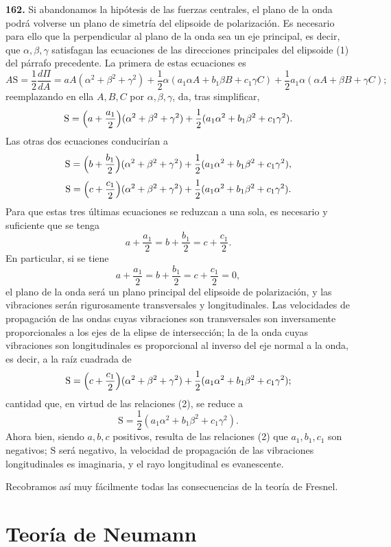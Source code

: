\noindent\textbf{162.} Si abandonamos la hipótesis de las fuerzas
centrales, el plano de la onda podrá volverse un plano de simetría del
elipsoide de polarización. Es necesario para ello que la perpendicular al
plano de la onda sea un eje principal, es decir, que
$\alpha,\beta,\gamma$ satisfagan las ecuaciones de las direcciones
principales del elipsoide (1) del párrafo precedente. La primera de estas
ecuaciones es
\[
A\mathrm S=\frac{1}{2}\frac{d\Pi}{dA}
=aA(\alpha^2+\beta^2+\gamma^2)+\frac{1}{2}\alpha(a_1\alpha A+b_1\beta B+c_1\gamma C)
+\frac{1}{2}a_1\alpha(\alpha A+\beta B+\gamma C);
\]
reemplazando en ella $A,B,C$ por $\alpha,\beta,\gamma$, da, tras
simplificar,
\[
\mathrm S=\Bigl(a+\frac{a_1}{2}\Bigr)(\alpha^2+\beta^2+\gamma^2)+\frac{1}{2}(a_1\alpha^2+b_1\beta^2+c_1\gamma^2).
\]
Las otras dos ecuaciones conducirían a
\[
\mathrm S=\Bigl(b+\frac{b_1}{2}\Bigr)(\alpha^2+\beta^2+\gamma^2)+\frac{1}{2}(a_1\alpha^2+b_1\beta^2+c_1\gamma^2),
\]
\[
\mathrm S=\Bigl(c+\frac{c_1}{2}\Bigr)(\alpha^2+\beta^2+\gamma^2)+\frac{1}{2}(a_1\alpha^2+b_1\beta^2+c_1\gamma^2).
\]
Para que estas tres últimas ecuaciones se reduzcan a una sola, es
necesario y suficiente que se tenga
\[
a+\frac{a_1}{2}=b+\frac{b_1}{2}=c+\frac{c_1}{2}.
\]
En particular, si se tiene
\begin{equation}
a+\frac{a_1}{2}=b+\frac{b_1}{2}=c+\frac{c_1}{2}=0,
\tag{2}
\end{equation}
el plano de la onda será un plano principal del elipsoide de polarización,
y las vibraciones serán rigurosamente transversales y longitudinales. Las
velocidades de propagación de las ondas cuyas vibraciones son
transversales son inversamente proporcionales a los ejes de la elipse de
intersección; la de la onda cuyas vibraciones son longitudinales es
proporcional al inverso del eje normal a la onda, es decir, a la raíz
cuadrada de
\[
\mathrm S=\Bigl(c+\frac{c_1}{2}\Bigr)(\alpha^2+\beta^2+\gamma^2)+\frac{1}{2}(a_1\alpha^2+b_1\beta^2+c_1\gamma^2);
\]
cantidad que, en virtud de las relaciones (2), se reduce a
\[
\mathrm S=\frac{1}{2}(a_1\alpha^2+b_1\beta^2+c_1\gamma^2).
\]
Ahora bien, siendo $a,b,c$ positivos, resulta de las relaciones (2) que
$a_1,b_1,c_1$ son negativos; $\mathrm S$ será negativo, la velocidad de
propagación de las vibraciones longitudinales es imaginaria, y el rayo
longitudinal es evanescente.

Recobramos así muy fácilmente todas las consecuencias de la teoría de
Fresnel.

\section{Teoría de Neumann}

